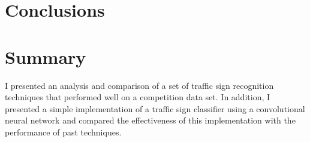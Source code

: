 \documentclass[letterpaper,twocolumn,10pt]{article}
\begin{document}
\section{Conclusions}


\section{Summary}

I presented an analysis and comparison of a set of traffic sign recognition techniques that performed well on a competition data set. In addition, I presented a simple implementation of a traffic sign classifier using a convolutional neural network and compared the effectiveness of this implementation with the performance of past techniques.


{\footnotesize 
}
\end{document}
